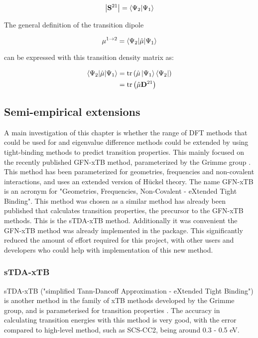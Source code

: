\begin{equation}
\left\lvert {\mathbf{S}^{21}} \right\rvert = \braket{\Psi_2|\Psi_1}
\end{equation}

The general definition of the transition dipole

\begin{equation}
\mathbf{\mu}^{1\rightarrow2} = \braket{\Psi_2|\hat{\mathbf{\mu}}|\Psi_1}
\end{equation}

can be expressed with this transition density matrix as:

\begin{equation}
\begin{split}    
\braket{\Psi_2|\hat{\mathbf{\mu}}|\Psi_1} &= \text{tr}\left(\hat{\mathbf{\mu}} \ket{\Psi_1} \bra{\Psi_2} \right) \\
&= \text{tr}\left( \hat{\mathbf{\mu}} \mathbf{D}^{21}\right)
\end{split}
\end{equation}

\subsection{Semi-empirical extensions}
\label{subsec:dscf_xtb}
A main investigation of this chapter is whether the range of DFT methods
that could be used for \dscf and eigenvalue difference methods could be extended 
by using tight-binding methods to predict transition properties.
This mainly focused on the recently published GFN-xTB method, parameterized by
the Grimme group \cite{Grimme2017}. This method has been parameterized for geometries,
frequencies and non-covalent interactions, and uses an extended version of H{\"u}ckel theory.
The name GFN-xTB is an acronym for "Geometries, Frequencies, Non-Covalent - eXtended Tight Binding".
This method was chosen as a similar method has already been published that calculates
transition properties, the precursor to the GFN-xTB methods. This is the sTDA-xTB
method.
Additionally it was convenient the GFN-xTB method was already implemented in the
 package. This significantly reduced the amount of effort required
for this project, with other users and developers who could help with implementation
of this new method.

\subsubsection{sTDA-xTB}
\label{subsubsec:stda_xtb}
sTDA-xTB ("simplified Tann-Dancoff Approximation - eXtended Tight Binding") is another
method in the family of xTB methods developed by the Grimme group, and is parameterised
for transition properties \cite{Grimme2016}. The accuracy in calculating transition energies with this
method is very good, with the error compared to high-level method, such as SCS-CC2,
being around 0.3 - 0.5 eV.

